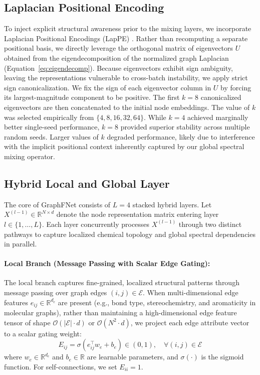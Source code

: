 \documentclass[10pt]{article}
\begin{document}
\subsection{Laplacian Positional Encoding}
To inject explicit structural awareness prior to the mixing layers, we incorporate Laplacian Positional Encodings (LapPE) \citep{dwivedi2021laplacian}. Rather than recomputing a separate positional basis, we directly leverage the orthogonal matrix of eigenvectors $U$ obtained from the eigendecomposition of the normalized graph Laplacian (Equation~\ref{eq:eigendecomp}). Because eigenvectors exhibit sign ambiguity, leaving the representations vulnerable to cross-batch instability, we apply strict sign canonicalization. We fix the sign of each eigenvector column in $U$ by forcing its largest-magnitude component to be positive. The first $k = 8$ canonicalized eigenvectors are then concatenated to the initial node embeddings. The value of $k$ was selected empirically from $\{4, 8, 16, 32, 64\}$. While $k = 4$ achieved marginally better single-seed performance, $k = 8$ provided superior stability across multiple random seeds. Larger values of $k$ degraded performance, likely due to interference with the implicit positional context inherently captured by our global spectral mixing operator.

\subsection{Hybrid Local and Global Layer}
The core of GraphFNet consists of $L=4$ stacked hybrid layers. Let $X^{(l-1)} \in \mathbb{R}^{N \times d}$ denote the node representation matrix entering layer $l \in \{1, \dots, L\}$. Each layer concurrently processes $X^{(l-1)}$ through two distinct pathways to capture localized chemical topology and global spectral dependencies in parallel.

\paragraph{Local Branch (Message Passing with Scalar Edge Gating):} 
The local branch captures fine-grained, localized structural patterns through message passing over graph edges $(i, j) \in \mathcal{E}$. When multi-dimensional edge features $e_{ij} \in \mathbb{R}^{d_e}$ are present (e.g., bond type, stereochemistry, and aromaticity in molecular graphs), rather than maintaining a high-dimensional edge feature tensor of shape $\mathcal{O}(|\mathcal{E}| \cdot d)$ or $\mathcal{O}(N^2 \cdot d)$, we project each edge attribute vector to a scalar gating weight:
\begin{equation}
E_{ij} = \sigma\left( e_{ij}^\top w_e + b_e \right) \in (0, 1), \quad \forall (i, j) \in \mathcal{E}
\end{equation}
where $w_e \in \mathbb{R}^{d_e}$ and $b_e \in \mathbb{R}$ are learnable parameters, and $\sigma(\cdot)$ is the sigmoid function. For self-connections, we set $E_{ii} = 1$. 
\end{document}

